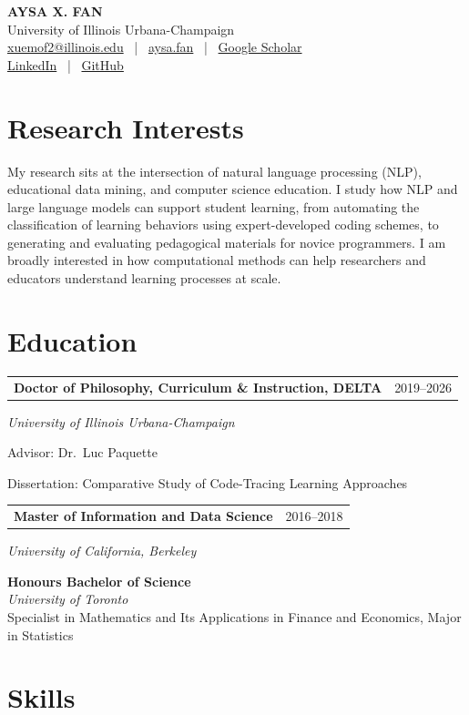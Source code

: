 \documentclass[10.5pt,letterpaper]{article}
\makeatletter
\newcommand{\entrydate}[2]{%
  \noindent\begin{tabularx}{\textwidth}{@{}X r@{}}
    \textbf{#1} & #2
  \end{tabularx}\vspace{-2pt}%
}
\newcommand{\entrysub}[1]{\noindent\textit{#1}\par}
\newcommand{\entryplain}[1]{\noindent #1\par}
\makeatother
\begin{document}
\begin{center}
  {\Large\bfseries\color{navy} AYSA X. FAN}\\[2pt]
  University of Illinois Urbana-Champaign\\[1pt]
  \href{mailto:xuemof2@illinois.edu}{xuemof2@illinois.edu} ~|~
  \href{https://aysa.fan}{aysa.fan} ~|~
  \href{https://scholar.google.com/citations?user=RJ9ICpYAAAAJ}{Google Scholar}\\[1pt]
  \href{https://linkedin.com/in/aysa-x-fan}{LinkedIn} ~|~
  \href{https://github.com/aysaxfan}{GitHub}
\end{center}

\section{Research Interests}
My research sits at the intersection of natural language processing (NLP), educational data mining, and computer science education. I study how NLP and large language models can support student learning, from automating the classification of learning behaviors using expert-developed coding schemes, to generating and evaluating pedagogical materials for novice programmers. I am broadly interested in how computational methods can help researchers and educators understand learning processes at scale.

\section{Education}

\entrydate{Doctor of Philosophy, Curriculum \& Instruction, DELTA}{2019--2026}
\entrysub{University of Illinois Urbana-Champaign}
\entryplain{Advisor: Dr.\ Luc Paquette}
\entryplain{Dissertation: Comparative Study of Code-Tracing Learning Approaches}
\vspace{2pt}

\entrydate{Master of Information and Data Science}{2016--2018}
\entrysub{University of California, Berkeley}
\vspace{2pt}

\noindent\textbf{Honours Bachelor of Science}\\
\textit{University of Toronto}\\
Specialist in Mathematics and Its Applications in Finance and Economics, Major in Statistics

\section{Skills}
\end{document}
